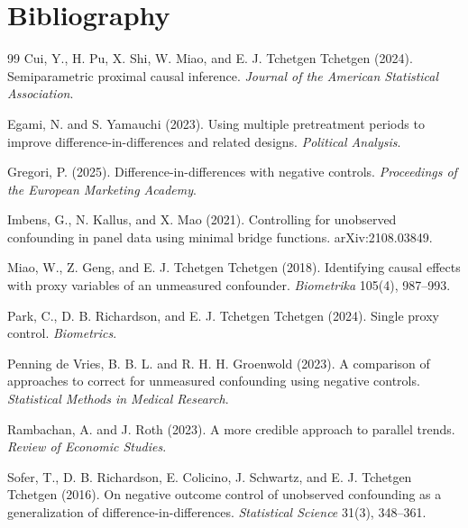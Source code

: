 \documentclass[11pt]{article}
\theoremstyle{definition}
\theoremstyle{plain}
\theoremstyle{remark}
\begin{document}
\section*{Bibliography}
\begin{thebibliography}{99}
Cui, Y., H. Pu, X. Shi, W. Miao, and E. J. Tchetgen Tchetgen (2024).
Semiparametric proximal causal inference.
\textit{Journal of the American Statistical Association}.

Egami, N. and S. Yamauchi (2023).
Using multiple pretreatment periods to improve difference-in-differences and related designs.
\textit{Political Analysis}.

Gregori, P. (2025).
Difference-in-differences with negative controls.
\textit{Proceedings of the European Marketing Academy}.

Imbens, G., N. Kallus, and X. Mao (2021).
Controlling for unobserved confounding in panel data using minimal bridge functions.
arXiv:2108.03849.

Miao, W., Z. Geng, and E. J. Tchetgen Tchetgen (2018).
Identifying causal effects with proxy variables of an unmeasured confounder.
\textit{Biometrika} 105(4), 987--993.

Park, C., D. B. Richardson, and E. J. Tchetgen Tchetgen (2024).
Single proxy control.
\textit{Biometrics}.

Penning de Vries, B. B. L. and R. H. H. Groenwold (2023).
A comparison of approaches to correct for unmeasured confounding using negative controls.
\textit{Statistical Methods in Medical Research}.

Rambachan, A. and J. Roth (2023).
A more credible approach to parallel trends.
\textit{Review of Economic Studies}.

Sofer, T., D. B. Richardson, E. Colicino, J. Schwartz, and E. J. Tchetgen Tchetgen (2016).
On negative outcome control of unobserved confounding as a generalization of difference-in-differences.
\textit{Statistical Science} 31(3), 348--361.


\end{thebibliography}
\end{document}
